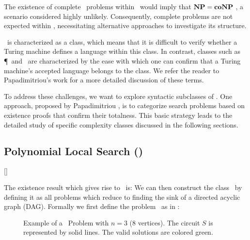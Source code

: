 The existence of complete \FNP\ problems within \TFNP\ would imply that $\textbf{NP} = \textbf{coNP}$ , a scenario considered highly unlikely. Consequently, complete problems are not expected within \TFNP, necessitating alternative approaches to investigate its structure.

\TFNP\ is characterized as a  class, which means that it is difficult to verify whether a Turing machine defines a language within this class. In contrast,  classes such as \P\ and \NP\ are characterized by the ease with which one can confirm that a Turing machine's accepted language belongs to the class. We refer the reader to Papadimitriou's work  for a more detailed discussion of these terms.

To address these challenges, we want to explore syntactic subclasses of \TFNP. One approach, proposed by Papadimitriou \cite{papadimitriou_computational_1994}, is to categorize search problems based on existence proofs that confirm their totalness. This basic strategy leads to the detailed study of specific complexity classes discussed in the following sections.

\subsection{Polynomial Local Search (\PLS)}[\PLS]

The existence result which gives rise to \PLS\ is:
We can then construct the class \PLS\ by defining it as all problems which reduce to finding the sink of a directed acyclic graph (DAG). Formally we first define the problem \Localopt\ as in :


\begin{figure}
    \centering
    \caption[Example of a \Localopt\ Problem]{Example of a \Localopt\ Problem with $n=3$ (8 vertices). The circuit $S$ is represented by solid lines. The valid solutions are colored green.}
    \label{fig:localopt_example}
\end{figure}

